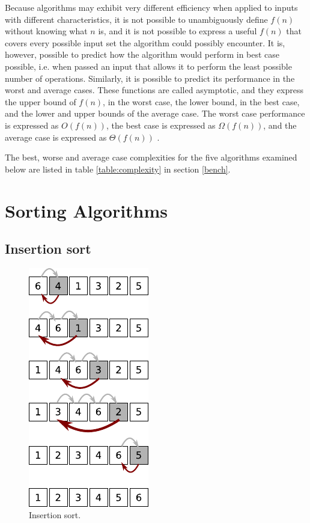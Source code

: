 \documentclass[12pt, a4paper]{article}
\begin{document}
Because algorithms may exhibit very different efficiency when applied to inputs with different characteristics, it is not possible to unambiguously define $f(n)$ without knowing what $n$ is, and it is not possible to express a useful $f(n)$ that covers every possible input set the algorithm could possibly encounter. It is, however, possible to predict how the algorithm would perform in best case possible, i.e. when passed an input that allows it to perform the least possible number of operations. Similarly, it is possible to predict its performance in the worst and average cases. These functions are called asymptotic, and they express the upper bound of $f(n)$, in the worst case, the lower bound, in the best case, and the lower and upper bounds of the average case. The worst case performance is expressed as $O(f(n))$, the best case is expressed as $\Omega(f(n))$, and the average case is expressed as $\Theta(f(n))$ \autocite[18]{heineman2016algorithms}.

The best, worse and average case complexities for the five algorithms examined below are listed in table \ref{table:complexity} in section \ref{bench}.

\section{Sorting Algorithms}

\subsection{Insertion sort}\label{sec:insertion}


\begin{figure}
    \centering
    \includegraphics{insertion_sort.pdf}
    \caption{\label{fig:insertion_sort}Insertion sort.}
\end{figure}
\end{document}
